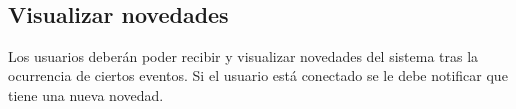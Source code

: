 \documentclass[a4paper, 12pt,twoside]{report}  %
\numberwithin{equation}{subsection} %
\begin{document}
\indent
\\\\\\\\\\\\\\\\\\\\\\\\
\\\\\\\\\\\\
\pagebreak

\subsection*{Visualizar novedades}
Los usuarios deberán poder recibir y visualizar novedades del sistema tras la ocurrencia de ciertos eventos. Si el usuario está conectado se le debe notificar que tiene una nueva novedad.

\renewcommand{\arraystretch}{1.4}
\end{document}
